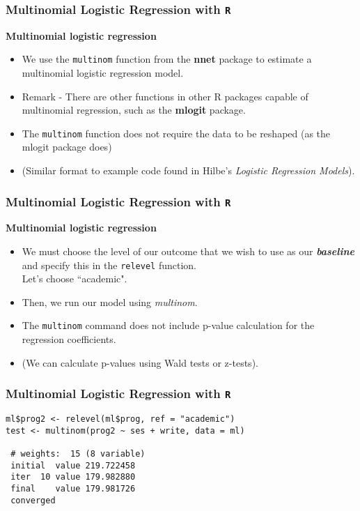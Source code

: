 \documentclass[00-GLMregslides.tex]{subfiles}
\begin{document}
\begin{frame}[fragile]
\frametitle{Multinomial Logistic Regression with \texttt{R}}
\Large
\textbf{Multinomial logistic regression}
\begin{itemize}
\item 
We use the \texttt{multinom} function from the \textbf{nnet} package to estimate a multinomial logistic regression model. 

\item Remark - There are other functions in other R packages capable of multinomial regression, such as the \textbf{mlogit} package. 
\item
  The \texttt{multinom} function does not require the data to be reshaped (as the mlogit package does) 
\item (Similar format to example code found in Hilbe's \textit{Logistic Regression Models}).
\end{itemize}
\end{frame}
  \begin{frame}[fragile]
  	\Large
  	\frametitle{Multinomial Logistic Regression with \texttt{R}}
\textbf{Multinomial logistic regression}
\begin{itemize}
\item  We must choose the level of our outcome that we wish to use as our \textbf{\textit{baseline}} and specify this in the \texttt{relevel} function. \\ Let's choose ``academic".
\item Then, we run our model using \textit{multinom}. 
\item The \texttt{multinom} command does not include p-value calculation for the regression coefficients.
\item (We can calculate p-values using Wald tests or z-tests).
 
\end{itemize}
\end{frame}
\begin{frame}[fragile]
\frametitle{Multinomial Logistic Regression with \texttt{R}}
\begin{framed}
	\begin{verbatim}
ml$prog2 <- relevel(ml$prog, ref = "academic")
test <- multinom(prog2 ~ ses + write, data = ml)
 
 # weights:  15 (8 variable)
 initial  value 219.722458 
 iter  10 value 179.982880
 final    value 179.981726 
 converged
\end{verbatim}
\end{framed}
\end{frame}
\end{document}
